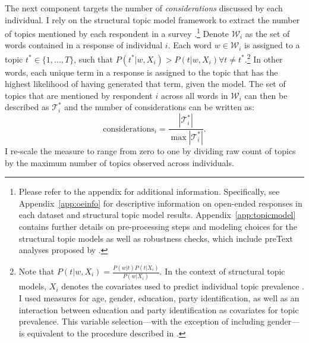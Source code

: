 The next component targets the number of \textit{considerations} discussed by each individual. I rely on the structural topic model framework to extract the number of topics mentioned by each respondent in a survey \citep{roberts2014structural}.\footnote{Please refer to the appendix for additional information. Specifically, see Appendix~\ref{app:oeinfo} for descriptive information on open-ended responses in each dataset and structural topic model results. Appendix~\ref{app:topicmodel} contains further details on pre-processing steps and modeling choices for the structural topic models as well as robustness checks, which include preText analyses proposed by \citet{denny2018text}.} Denote $\mathcal{W}_i$ as the set of words contained in a response of individual $i$. Each word $w\in\mathcal{W}_i$ is assigned to a topic $t^* \in \{1,...,T\} $, such that $P(t^*|w,X_i) > P(t|w,X_i) \forall t\neq t^*$.\footnote{Note that $P(t|w,X_i)=\tfrac{P(w|t)P(t|X_i)}{P(w|X_i)}$. In the context of structural topic models, $X_i$ denotes the covariates used to predict individual topic prevalence \citep[see][for details]{roberts2014structural}. I used measures for age, gender, education, party identification, as well as an interaction between education and party identification as covariates for topic prevalence. This variable selection---with the exception of including gender---is equivalent to the procedure described in \citet{roberts2014structural}.} In other words, each unique term in a response is assigned to the topic that has the highest likelihood of having generated that term, given the model. The set of topics that are mentioned by respondent $i$ across all words in $\mathcal{W}_i$ can then be described as $\mathcal{T}^*_i$ and the number of considerations can be written as:
\begin{equation}
\text{considerations}_i = \dfrac{|\mathcal{T}^*_i|}{\max|\mathcal{T}^*_i|}.
\end{equation}
I re-scale the measure to range from zero to one by dividing raw count of topics by the maximum number of topics observed across individuals.


